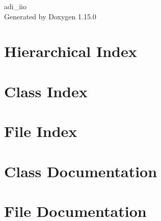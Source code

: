 \documentclass[twoside]{book}
\newcommand{\+}{\discretionary{\mbox{\scriptsize$\hookleftarrow$}}{}{}}
\newcommand{\clearemptydoublepage}{%
    \newpage{\pagestyle{empty}\cleardoublepage}%
  }
\begin{document}
  \raggedbottom
    \hypersetup{pageanchor=false,
                bookmarksnumbered=true,
                pdfencoding=unicode
               }
  \begin{titlepage}
  \vspace*{7cm}
  \begin{center}%
  {\Large adi\+\_\+iio}\\
  \vspace*{1cm}
  {\large Generated by Doxygen 1.15.0}\\
  \end{center}
  \end{titlepage}
  \clearemptydoublepage
  \tableofcontents
  \clearemptydoublepage
  \hypersetup{pageanchor=true}
\chapter{Hierarchical Index}

\chapter{Class Index}

\chapter{File Index}

\chapter{Class Documentation}










\chapter{File Documentation}





  \backmatter
  \newpage
  \clearemptydoublepage
  \printindex
\end{document}
